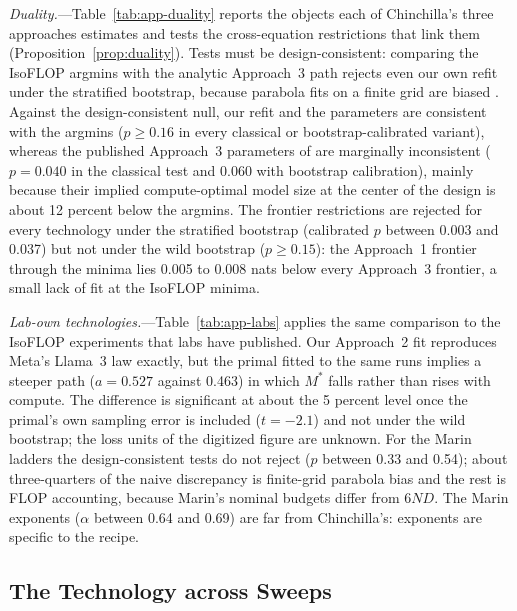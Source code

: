 \emph{Duality.}---Table~\ref{tab:app-duality} reports the objects each of Chinchilla's three approaches estimates
and tests the cross-equation restrictions that link them (Proposition~\ref{prop:duality}). Tests must be
design-consistent: comparing the IsoFLOP argmins with the analytic Approach~3 path rejects even our own refit under
the stratified bootstrap, because parabola fits on a finite grid are biased \citep{czech2026problems}. Against the
design-consistent null, our refit and the \citet{besiroglu2024chinchilla} parameters are consistent with the argmins
($p\ge0.16$ in every classical or bootstrap-calibrated variant), whereas the published Approach~3 parameters of \citet{hoffmann2022training} are
marginally inconsistent ($p=0.040$ in the classical test and 0.060 with bootstrap calibration), mainly because their
implied compute-optimal model size at the center of the design is about 12 percent below the argmins. The frontier
restrictions are rejected for every technology under the stratified bootstrap (calibrated $p$ between 0.003 and 0.037)
but not under the wild bootstrap ($p\ge0.15$): the Approach~1 frontier through the minima lies 0.005 to 0.008 nats
below every Approach~3 frontier, a small lack of fit at the IsoFLOP minima.

\emph{Lab-own technologies.}---Table~\ref{tab:app-labs} applies the same comparison to the IsoFLOP experiments that
labs have published. Our Approach~2 fit reproduces Meta's Llama~3 law exactly, but the primal fitted to the same runs
implies a steeper path ($a=0.527$ against 0.463) in which $M^*$ falls rather than rises with compute. The difference
is significant at about the 5 percent level once the primal's own sampling error is included ($t=-2.1$) and not under
the wild bootstrap; the loss units of the digitized figure are unknown. For the Marin ladders the design-consistent
tests do not reject ($p$ between 0.33 and 0.54); about three-quarters of the naive discrepancy is finite-grid parabola
bias and the rest is FLOP accounting, because Marin's nominal budgets differ from $6ND$. The Marin exponents
($\alpha$ between 0.64 and 0.69) are far from Chinchilla's: exponents are specific to the recipe.





\clearpage

\subsection{The Technology across Sweeps}\label{app:add-tech}

